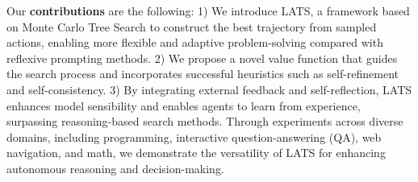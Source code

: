 \documentclass{article}
\newcommand{\yxw}[1]{\textcolor{blue}{[{\bf yxw:} #1]}}
\newcommand{\az}[1]{\textcolor{orange}{[{\bf andy:} #1]}}
\theoremstyle{plain}
\theoremstyle{definition}
\theoremstyle{remark}
\begin{document}

\vspace{0.04in}

Our \textbf{contributions} are the following: 1) We introduce LATS, a framework based on Monte Carlo Tree Search to construct the best trajectory from sampled actions, enabling more flexible and adaptive problem-solving compared with reflexive prompting methods. 2) We propose a novel value function that guides the search process and incorporates successful heuristics such as self-refinement and self-consistency. 3) By integrating external feedback and self-reflection, LATS enhances model sensibility and enables agents to learn from experience, surpassing reasoning-based search methods. Through experiments across diverse domains, including programming, interactive question-answering (QA), web navigation, and math, we demonstrate the versatility of LATS for enhancing autonomous reasoning and decision-making.
\end{document}
